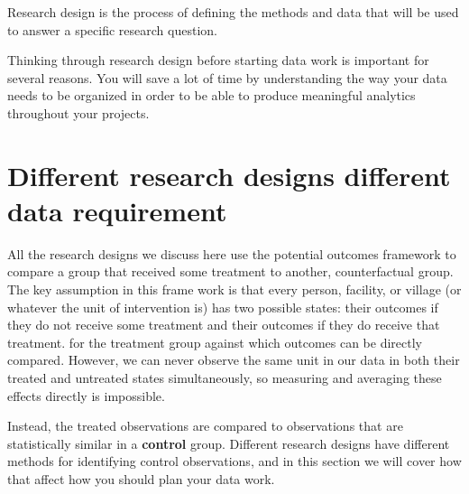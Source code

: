
\begin{fullwidth}
Research design is the process of defining the methods and data
that will be used to answer a specific research question.


Thinking through research design before starting data work is important for several reasons. You will save a lot of time by understanding the way
your data needs to be organized
in order to be able to produce meaningful analytics throughout your projects.




\end{fullwidth}


\section{Different research designs different data requirement }


All the research designs we discuss here use the potential outcomes framework\cite{athey2017state}
to compare a group that received some treatment to another, counterfactual group. 
The key assumption in this frame work is that every
person, facility, or village (or whatever the unit of intervention is)
has two possible states: their outcomes if they do not receive some treatment
and their outcomes if they do receive that treatment.
for the treatment group against which outcomes can be directly compared.
However, we can never observe the same unit in our data
in both their treated and untreated states simultaneously,
so measuring and averaging these effects directly is impossible.

Instead, the treated observations are compared to observations that are statistically similar in a \textbf{control} group. Different research designs have different methods for identifying control observations, and in this section we will cover how that affect how you should plan your data work.  

